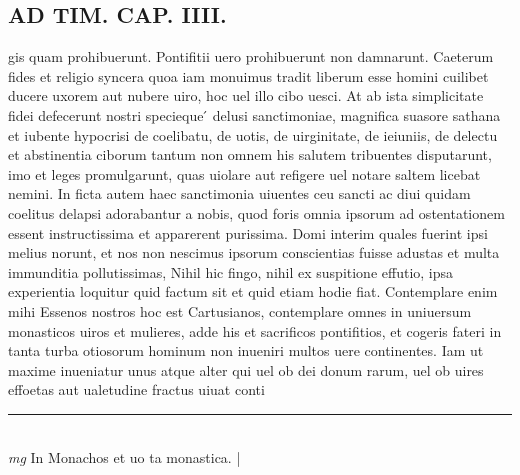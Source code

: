 \documentclass{article}
\begin{document}
\begin{pages}
\section*{AD TIM. CAP. IIII. }
\marginpar{[ p.139 ]}\pstart gis quam prohibuerunt. Pontifitii uero prohibuerunt non damnarunt. Caeterum fides et religio syncera quoa iam monuimus tradit liberum esse homini cuilibet ducere uxorem aut nubere uiro, hoc uel illo cibo uesci. At ab ista simplicitate fidei defecerunt nostri specieque ́ delusi sanctimoniae, magnifica suasore sathana et iubente hypocrisi de coelibatu, de uotis, de uirginitate, de ieiuniis, de delectu et abstinentia ciborum tantum non omnem his salutem tribuentes disputarunt, imo et leges promulgarunt, quas uiolare aut refigere uel notare saltem licebat nemini. In ficta autem haec sanctimonia uiuentes ceu sancti ac diui quidam coelitus delapsi adorabantur a nobis, quod foris omnia ipsorum ad ostentationem essent instructissima et apparerent purissima. Domi interim quales fuerint ipsi melius norunt, et nos non nescimus ipsorum conscientias fuisse adustas et multa immunditia pollutissimas, Nihil hic fingo, nihil ex suspitione effutio, ipsa experientia loquitur quid factum sit et quid etiam hodie fiat. Contemplare enim mihi Essenos nostros hoc est Cartusianos, contemplare omnes in uniuersum monasticos uiros et mulieres, adde his et sacrificos pontifitios, et cogeris fateri in tanta turba otiosorum hominum non inueniri multos uere continentes. Iam ut maxime inueniatur unus atque alter qui uel ob dei donum rarum, uel ob uires effoetas aut ualetudine fractus uiuat conti\pend
\vspace{0.5cm}\noindent
\vspace{0.2cm}\rule{1cm}{0.2pt}\\ 
\hspace{0.2cm}\textit{mg}
\footnotesize In Monachos et uo ta monastica. 
\normalsize| 

\end{pages}
\end{document}
